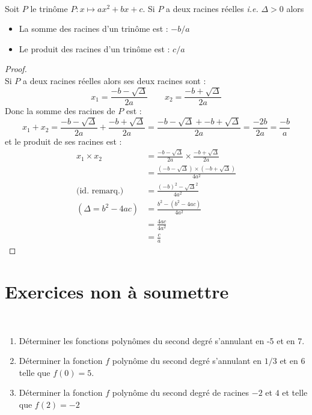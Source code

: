 \documentclass[12pt,fleqn]{report} %
\begin{document}
\begin{proposition}\text{ }\\
	Soit $P$ le trinôme $P :x \mapsto a x^2 + bx + c$. Si $P$ a deux racines réelles \emph{i.e.} $\Delta >0$ alors 
	\begin{itemize}
		\item La somme des racines d'un trinôme est  : $-b/a$
		\item Le produit des racines d'un trinôme est : $c/a$
	\end{itemize} 
\end{proposition}
\begin{proof}\text{ }\\
	Si $P$ a deux racines réelles alors ses deux racines sont :\[
	x_1 = \frac{-b - \sqrt{\Delta}}{2a} \qquad x_2 = \frac{-b + \sqrt{\Delta}}{2a}
	\]
	Donc la somme des racines de $P$ est :
	\[
	x_1 + x_2 = \frac{-b - \sqrt{\Delta}}{2a} + \frac{-b + \sqrt{\Delta}}{2a} = \frac{-b - \sqrt{\Delta} + -b + \sqrt{\Delta}}{2a} = \frac{-2b}{2a} = \frac{-b}{a}
	\]
	et le produit de ses racines est :
	\begin{align*}
	x_1 \times x_2 & = \frac{-b - \sqrt{\Delta}}{2a} \times \frac{-b + \sqrt{\Delta}}{2a} \\ 
	& = \frac{\left(-b - \sqrt{\Delta}\right)\times \left({-b + \sqrt{\Delta}}\right)}{4a^2}\\
	\text{(id. remarq.)} & = \frac{(-b)^2 - \sqrt{\Delta}^2}{4a^2} \\ 
	(\Delta = b^2 - 4ac)  & = \frac{b^2 - (b^2 - 4ac)}{4a^2} \\ 
	& = \frac{4ac}{4a^2} \\
	& = \frac{c}{a}
	\end{align*}
\end{proof}



\chapter*{Exercices non à soumettre}
\begin{exercise}\label{Exercice 48}\text{ }\\
	\begin{enumerate}
		\item Déterminer les fonctions polynômes du second degré s'annulant en -5 et en 7.
		\item Déterminer la fonction $f$ polynôme du second degré s'annulant en $1/3$ et en $6$ telle que $f(0) = 5$.
		\item Déterminer la fonction $f$ polynôme du second degré de racines $-2$ et $4$ et telle que $f(2) = -2$
	\end{enumerate}
\end{exercise}
\end{document}
